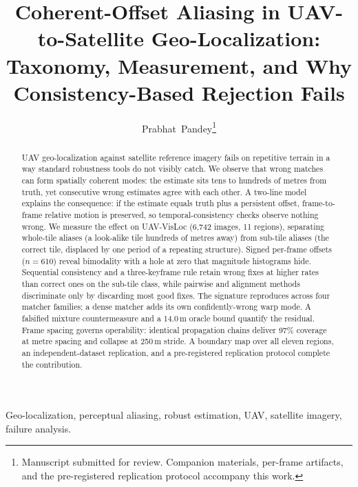 \documentclass[journal]{IEEEtran}
\begin{document}
\title{Coherent-Offset Aliasing in UAV-to-Satellite Geo-Localization:\\ Taxonomy, Measurement, and Why Consistency-Based Rejection Fails}

\author{Prabhat~Pandey\thanks{Manuscript submitted for review. Companion materials, per-frame artifacts, and the pre-registered replication protocol accompany this work.}}


\maketitle

\begin{abstract}
UAV geo-localization against satellite reference imagery fails on repetitive terrain in a way standard robustness tools do not visibly catch. We observe that wrong matches can form spatially coherent modes: the estimate sits tens to hundreds of metres from truth, yet consecutive wrong estimates agree with each other. A two-line model explains the consequence: if the estimate equals truth plus a persistent offset, frame-to-frame relative motion is preserved, so temporal-consistency checks observe nothing wrong. We measure the effect on UAV-VisLoc (6,742 images, 11 regions), separating whole-tile aliases (a look-alike tile hundreds of metres away) from sub-tile aliases (the correct tile, displaced by one period of a repeating structure). Signed per-frame offsets ($n=610$) reveal bimodality with a hole at zero that magnitude histograms hide. Sequential consistency and a three-keyframe rule retain wrong fixes at higher rates than correct ones on the sub-tile class, while pairwise and alignment methods discriminate only by discarding most good fixes. The signature reproduces across four matcher families; a dense matcher adds its own confidently-wrong warp mode. A falsified mixture countermeasure and a 14.0\,m oracle bound quantify the residual. Frame spacing governs operability: identical propagation chains deliver 97\% coverage at metre spacing and collapse at 250\,m stride. A boundary map over all eleven regions, an independent-dataset replication, and a pre-registered replication protocol complete the contribution.
\end{abstract}

\begin{IEEEkeywords}
Geo-localization, perceptual aliasing, robust estimation, UAV, satellite imagery, failure analysis.
\end{IEEEkeywords}
\end{document}
